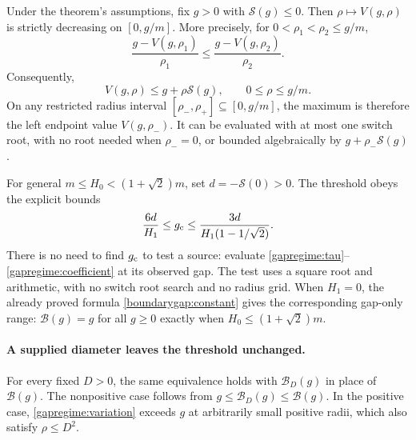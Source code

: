 \begin{corollary}
\label{gapregime:radius-monotone}
Under the theorem's assumptions, fix $g>0$ with $\mathcal S(g)\le0$.
Then $\rho\mapsto V(g,\rho)$ is strictly decreasing on $[0,g/m]$.
More precisely, for $0<\rho_1<\rho_2\le g/m$,
\begin{equation}\label{gapregime:deficit-ratio}
 \frac{g-V(g,\rho_1)}{\rho_1}
       \le\frac{g-V(g,\rho_2)}{\rho_2}.
\end{equation}
Consequently,
\begin{equation}\label{gapregime:tangent-upper}
 V(g,\rho)\le g+\rho\mathcal S(g),
       \qquad 0\le\rho\le g/m.
\end{equation}
On any restricted radius interval $[\rho_-,\rho_+]\subseteq[0,g/m]$,
the maximum is therefore the left endpoint value $V(g,\rho_-)$.
It can be evaluated with at most one switch root, with no root needed
when $\rho_-=0$, or bounded algebraically by $g+\rho_-\mathcal S(g)$.
\end{corollary}

For general $m\le H_0<(1+\sqrt2)m$, set
$d=-\mathcal S(0)>0$.  The threshold obeys the explicit bounds
\begin{equation}\label{gapregime:threshold-bracket}
 \frac{6d}{H_1}\le g_{\rm c}
 \le\frac{3d}{H_1(1-1/\sqrt2)}.
\end{equation}
There is no need to find $g_{\rm c}$ to test a source: evaluate
\eqref{gapregime:tau}--\eqref{gapregime:coefficient} at its observed
gap.  The test uses a square root and arithmetic, with no switch
root search and no radius grid.  When $H_1=0$, the already proved
formula \eqref{boundarygap:constant} gives the corresponding
gap-only range: $\mathcal B(g)=g$ for all $g\ge0$ exactly when
$H_0\le(1+\sqrt2)m$.

\paragraph{A supplied diameter leaves the threshold unchanged.}
For every fixed $D>0$, the same equivalence holds with
$\mathcal B_D(g)$ in place of $\mathcal B(g)$.
The nonpositive case follows from
$g\le\mathcal B_D(g)\le\mathcal B(g)$.
In the positive case, \eqref{gapregime:variation} exceeds $g$ at
arbitrarily small positive radii, which also satisfy $\rho\le D^2$.

